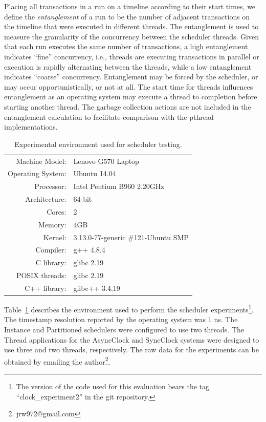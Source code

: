 Placing all transactions in a run on a timeline according to their start times, we define the \emph{entanglement} of a run to be the number of adjacent transactions on the timeline that were executed in different threads.
The entanglement is used to measure the granularity of the concurrency between the scheduler threads.
Given that each run executes the same number of transactions, a high entanglement indicates ``fine'' concurrency, i.e., threads are executing transactions in parallel or execution is rapidly alternating between the threads, while a low entanglement indicates ``coarse'' concurrency.
Entanglement may be forced by the scheduler, or may occur opportunistically, or not at all.
The start time for threads influences entanglement as an operating system may execute a thread to completion before starting another thread.
The garbage collection actions are not included in the entanglement calculation to facilitate comparison with the pthread implementations.

\begin{table}
\center
\begin{tabular}{rl}
Machine Model:    & Lenovo G570 Laptop \\
Operating System: & Ubuntu 14.04 \\
Processor:        & Intel Pentium B960 2.20GHz \\
Architecture:     & 64-bit \\
Cores:            & 2 \\
Memory:           & 4GB \\
Kernel:           & 3.13.0-77-generic \#121-Ubuntu SMP \\
Compiler:         & g++ 4.8.4 \\
C library:        & glibc 2.19 \\
POSIX threads:    & glibc 2.19 \\
C++ library:      & glibc++ 3.4.19 \\
\end{tabular}
\caption{Experimental environment used for scheduler testing.\label{environment}}
\end{table}

Table~\ref{environment} describes the environment used to perform the scheduler experiments\footnote{The version of the code used for this evaluation bears the tag ``clock\_experiment2'' in the git repository.}.
The timestamp resolution reported by the operating system was 1 ns.
The Instance and Partitioned schedulers were configured to use two threads.
The Thread applications for the AsyncClock and SyncClock systems were designed to use three and two threads, respectively.
The raw data for the experiments can be obtained by emailing the author\footnote{jrw972@gmail.com}.

